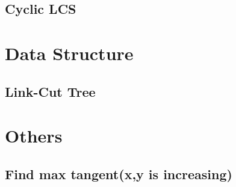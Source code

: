 \documentclass[a4paper,10pt,twocolumn,oneside]{article}
\begin{document}
\subsection{Cyclic LCS}


\section{Data Structure}

%

\subsection{Link-Cut Tree}


%

%

%

%

\section{Others}

\subsection{Find max tangent(x,y is increasing)}

\end{document}
